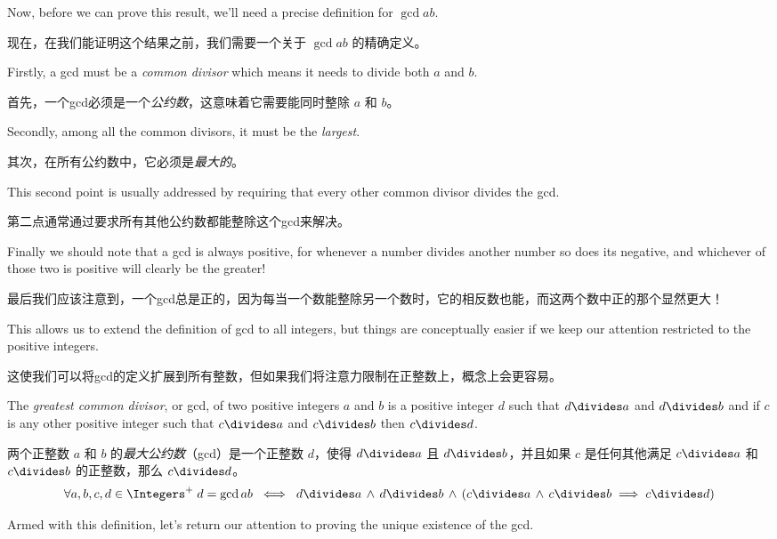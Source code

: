 Now, before we can prove this result, we'll need a precise definition
for $\gcd{a}{b}$.

现在，在我们能证明这个结果之前，我们需要一个关于 $\gcd{a}{b}$ 的精确定义。

Firstly, a gcd must be a \emph{common divisor} which
means it needs to divide both $a$ and $b$.

首先，一个gcd必须是一个\emph{公约数}，这意味着它需要能同时整除 $a$ 和 $b$。

Secondly, among all the common
divisors, it must be the \emph{largest}.

其次，在所有公约数中，它必须是\emph{最大的}。

This second point is usually
addressed
by requiring that every other common divisor divides the gcd.

第二点通常通过要求所有其他公约数都能整除这个gcd来解决。

Finally we
should note that a gcd is always positive, for whenever a number divides
another number so does its negative, and whichever of those two is positive
will clearly be the greater!

最后我们应该注意到，一个gcd总是正的，因为每当一个数能整除另一个数时，它的相反数也能，而这两个数中正的那个显然更大！

This allows us to extend the definition of
gcd to all integers, but things are conceptually easier if we
keep our attention restricted to the positive integers.

这使我们可以将gcd的定义扩展到所有整数，但如果我们将注意力限制在正整数上，概念上会更容易。

\begin{defi}
      The \emph{greatest common divisor}, or gcd, of two positive
      integers $a$ and $b$
      is a positive integer $d$ such that $d \divides a$ and $d \divides b$ and if $c$ is any
      other positive integer such that $c \divides a$ and $c \divides b$ then $c \divides d$.

      两个正整数 $a$ 和 $b$ 的\emph{最大公约数}（gcd）是一个正整数 $d$，使得 $d \divides a$ 且 $d \divides b$，并且如果 $c$ 是任何其他满足 $c \divides a$ 和 $c \divides b$ 的正整数，那么 $c \divides d$。
      \[ \forall a,b,c,d \in \Integers^+ \; d=\gcd{a}{b} \; \iff \; d \divides a \, \land \, d \divides b \, \land \, (c \divides a \, \land \, c \divides b  \implies c \divides d)\]
\end{defi}

Armed with this definition, let's return our attention to proving the
unique existence of the gcd.

